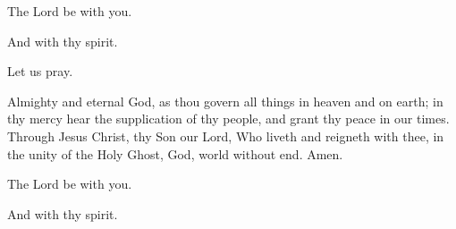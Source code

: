 



\rubric{\Vbar}The Lord be with you.

\rubric{\Rbar}And with thy spirit.

Let us pray.

Almighty and eternal God, as thou govern all things in heaven and on earth; in thy mercy hear the supplication of thy people, and grant thy peace in our times. Through Jesus Christ, thy Son our Lord, Who liveth and reigneth with thee, in the unity of the Holy Ghost, God, world without end. \rubric{\Rbar} Amen.

\rubric{\Vbar}The Lord be with you.

\rubric{\Rbar}And with thy spirit.